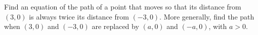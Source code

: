 Find an equation of the path of a point that moves so that its distance from $(3,0)$ is always twice its distance from $(-3,0)$. More generally, find the path when $(3,0)$ and $(-3,0)$ are replaced by $(a,0)$ and $(-a,0)$, with $a>0$.

